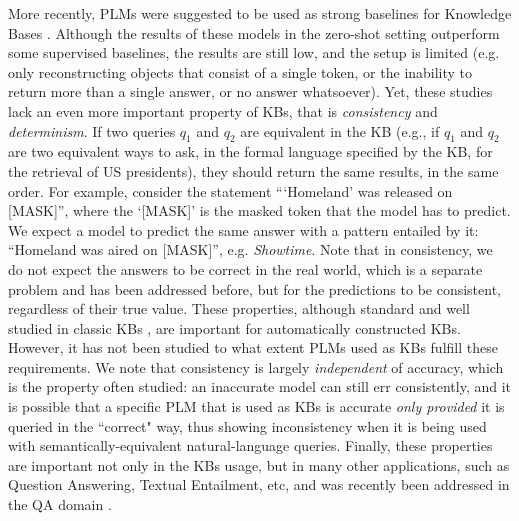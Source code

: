 More recently, PLMs were suggested to be used as strong baselines for Knowledge Bases \cite{lama,jiang2020can}. Although the results of these models in the zero-shot setting outperform some supervised baselines, the results are still low, and the setup is limited (e.g. only reconstructing objects that consist of a single token, or the inability to return more than a single answer, or no answer whatsoever).
Yet, these studies lack an even more important property of KBs, that is \textit{consistency} and \textit{determinism}.
If two queries $q_1$ and $q_2$ are equivalent in the KB (e.g., if $q_1$ and $q_2$ are two equivalent ways to ask, in the formal language specified by the KB, for the retrieval of US presidents), they should return the same results, in the same order.
For example, consider the statement ```Homeland' was released on [MASK]'', where the `[MASK]' is the masked token that the model has to predict. We expect a model to predict the same answer with a pattern entailed by it: ``Homeland was aired on [MASK]'', e.g. \textit{Showtime}.
Note that in consistency, we do not expect the answers to be correct in the real world, which is a separate problem and has been addressed before, but for the predictions to be consistent, regardless of their true value.
These properties, although standard and well studied in classic KBs \cite{hansen2000probabilistic,Thimm:2009d,muino2011measuring}, are important for automatically constructed KBs.
However, it has not been studied to what extent PLMs used as KBs fulfill these requirements.
We note that consistency is largely \emph{independent} of accuracy, which is the property often studied: an inaccurate model can still err consistently, and it is possible that a specific PLM that is used as KBs is accurate \emph{only provided} it is queried in the ``correct" way, thus showing inconsistency when it is being used with semantically-equivalent natural-language queries.
Finally, these properties are important not only in the KBs usage, but in many other applications, such as Question Answering, Textual Entailment, etc, and was recently been addressed in the QA domain \cite{consistent-qa}. 


